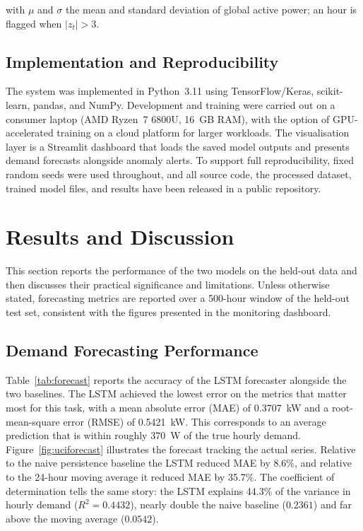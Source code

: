 \documentclass[conference]{IEEEtran}
\begin{document}
with $\mu$ and $\sigma$ the mean and standard deviation of global active power;
an hour is flagged when $|z_t| > 3$.
 
\subsection{Implementation and Reproducibility}
The system was implemented in Python~3.11 using TensorFlow/Keras, scikit-learn,
pandas, and NumPy. Development and training were carried out on a consumer laptop
(AMD Ryzen~7 6800U, 16~GB RAM), with the option of GPU-accelerated training on a
cloud platform for larger workloads. The visualisation layer is a Streamlit
dashboard that loads the saved model outputs and presents demand forecasts
alongside anomaly alerts. To support full reproducibility, fixed random seeds
were used throughout, and all source code, the processed dataset, trained model
files, and results have been released in a public repository.

\section{Results and Discussion}\label{sec:results}
This section reports the performance of the two models on the held-out data and
then discusses their practical significance and limitations. Unless otherwise
stated, forecasting metrics are reported over a 500-hour window of the held-out
test set, consistent with the figures presented in the monitoring dashboard.
 
\subsection{Demand Forecasting Performance}
Table~\ref{tab:forecast} reports the accuracy of the LSTM forecaster alongside
the two baselines. The LSTM achieved the lowest error on the metrics that matter
most for this task, with a mean absolute error (MAE) of 0.3707~kW and a
root-mean-square error (RMSE) of 0.5421~kW. This corresponds to an average
prediction that is within roughly 370~W of the true hourly demand. Figure~\ref{fig:uciforecast} illustrates the forecast tracking the actual series. Relative to
the naive persistence baseline the LSTM reduced MAE by 8.6\%, and relative to the
24-hour moving average it reduced MAE by 35.7\%. The coefficient of
determination tells the same story: the LSTM explains 44.3\% of the variance in
hourly demand ($R^2 = 0.4432$), nearly double the naive baseline ($0.2361$) and
far above the moving average ($0.0542$).
 
\end{document}
